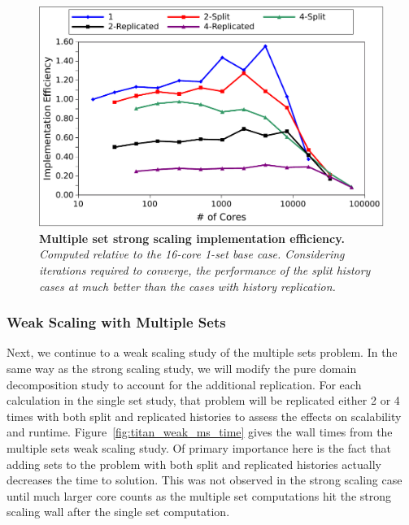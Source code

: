\begin{figure}[t!]
  \begin{center}
    \includegraphics[width=6in]{chapters/parallel_mc/titan_strong_ms_impeff.pdf}
  \end{center}
  \caption{\textbf{Multiple set strong scaling implementation
      efficiency.} \textit{Computed relative to the 16-core 1-set base
      case. Considering iterations required to converge, the
      performance of the split history cases at much better than the
      cases with history replication.}}
  \label{fig:titan_strong_ms_impeff}
\end{figure}

\clearpage

\subsubsection{Weak Scaling with Multiple Sets}
\label{subsubsec:ms_weak}

Next, we continue to a weak scaling study of the multiple sets
problem. In the same way as the strong scaling study, we will modify
the pure domain decomposition study to account for the additional
replication. For each calculation in the single set study, that
problem will be replicated either 2 or 4 times with both split and
replicated histories to assess the effects on scalability and
runtime. Figure~\ref{fig:titan_weak_ms_time} gives the wall times from
the multiple sets weak scaling study. Of primary importance here is
the fact that adding sets to the problem with both split and
replicated histories actually decreases the time to solution. This was
not observed in the strong scaling case until much larger core counts
as the multiple set computations hit the strong scaling wall after the
single set computation.

